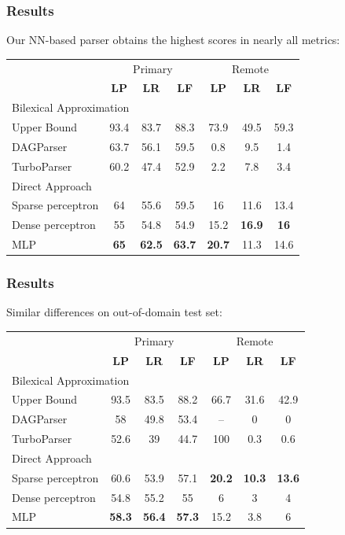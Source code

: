 \documentclass[t]{beamer}
\begin{document}
\begin{frame}
\frametitle{Results}
Our NN-based parser obtains the highest scores in nearly all metrics:
\begin{center}
	\begin{tabular}{l|ccc|ccc}
	& \multicolumn{3}{c|}{Primary} & \multicolumn{3}{c}{Remote} \\
	& \textbf{LP} & \textbf{LR} & \textbf{LF} & \textbf{LP} & \textbf{LR} & \textbf{LF} \\
	\hline
	\multicolumn{4}{l}{\rule{0pt}{2ex} \footnotesize Bilexical Approximation} \\
	Upper Bound %
	& 93.4 & 83.7 & 88.3 & 73.9 & 49.5 & 59.3 \vspace{.1cm} \\
	DAGParser
	& 63.7 & 	56.1	 & 59.5	 & 0.8	 & 9.5	 &  1.4 \\
	TurboParser
	& 60.2	 & 47.4	 & 52.9	 & 2.2	 & 7.8	 &  3.4 \\
	\hline
	\multicolumn{4}{l}{\rule{0pt}{2ex} \footnotesize Direct Approach} \\
	Sparse perceptron
	& 64 & 55.6 & 59.5 & 16 & 11.6 & 13.4 \\
	Dense perceptron
	& 55 & 54.8 & 54.9 & 15.2 & \bf 16.9 & \bf 16 \\
	MLP
	& \bf 65 & \bf 62.5 & \bf 63.7 & \bf 20.7 & 11.3 & 14.6
	\end{tabular}
\end{center}
\end{frame}

\begin{frame}
\frametitle{Results}
Similar differences on out-of-domain test set:
\begin{center}
	\begin{tabular}{l|ccc|ccc}
	& \multicolumn{3}{c|}{Primary} & \multicolumn{3}{c}{Remote} \\
	& \textbf{LP} & \textbf{LR} & \textbf{LF} & \textbf{LP} & \textbf{LR} & \textbf{LF} \\
	\hline
	\multicolumn{4}{l}{\rule{0pt}{2ex} \footnotesize Bilexical Approximation} \\
	Upper Bound %
	& 93.5 & 83.5 & 88.2 & 66.7 & 31.6 & 42.9 \vspace{.1cm} \\
	DAGParser
	& 58	 & 49.8	 & 53.4 & -- & 0 & 0 \\
	TurboParser
	& 52.6	 & 39	 & 44.7	 & 100	 & 0.3	 & 0.6 \\
	\hline
	\multicolumn{4}{l}{\rule{0pt}{2ex} \footnotesize Direct Approach} \\
	Sparse perceptron
	& 60.6 & 53.9 & 57.1 & \bf 20.2 & \bf 10.3 & \bf 13.6 \\
	Dense perceptron
	& 54.8 & 55.2 & 55 & 6 & 3 & 4 \\
	MLP
	& \bf 58.3 & \bf 56.4 & \bf 57.3 & 15.2 & 3.8 & 6
	\end{tabular}
\end{center}
\end{frame}
\end{document}
